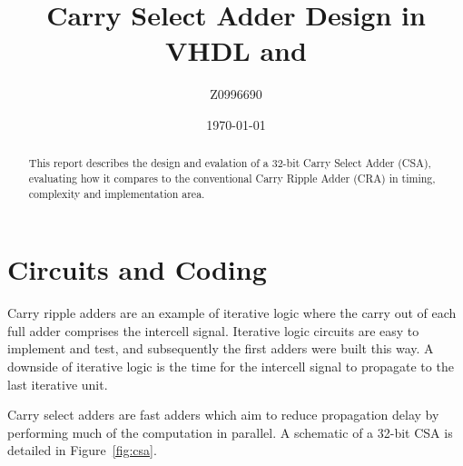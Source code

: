 \documentclass[a4paper,11pt]{article}
\title{Carry Select Adder Design in VHDL and \Altera \QuartusII}
\author{Z0996690}
\date{\today}
\begin{document}
\begin{@twocolumnfalse} \centering
    \renewcommand{\abstractname}{\large Abstract}
    \begin{abstract}
        This report describes the design and evalation of a 32-bit Carry Select Adder (CSA), evaluating how it compares to the conventional Carry Ripple Adder (CRA) in timing, complexity and implementation area.
    \end{abstract}
\end{@twocolumnfalse}

\section{Circuits and Coding}

Carry ripple adders are an example of iterative logic where the carry out of each full adder comprises the intercell signal. Iterative logic circuits are easy to implement and test, and subsequently the first adders were built this way. A downside of iterative logic is the time for the intercell signal to propagate to the last iterative unit.

Carry select adders are fast adders which aim to reduce propagation delay by performing much of the computation in parallel. A schematic of a 32-bit CSA is detailed in Figure~\ref{fig:csa}.
\end{document}
